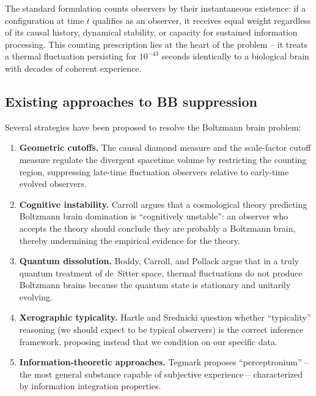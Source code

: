 \documentclass[11pt]{article}
\begin{document}
The standard formulation counts observers by their instantaneous
existence: if a configuration at time $t$ qualifies as an observer,
it receives equal weight regardless of its causal history, dynamical
stability, or capacity for sustained information processing.  This
counting prescription lies at the heart of the problem -- it treats a
thermal fluctuation persisting for $10^{-43}$ seconds identically to
a biological brain with decades of coherent experience.

\subsection{Existing approaches to BB suppression}

Several strategies have been proposed to resolve the Boltzmann brain
problem:

\begin{enumerate}
\item \textbf{Geometric cutoffs.}  The causal diamond measure
  \cite{Bousso2006} and the scale-factor cutoff measure
  \cite{DeSimone2010} regulate the divergent spacetime volume by
  restricting the counting region, suppressing late-time fluctuation
  observers relative to early-time evolved observers.

\item \textbf{Cognitive instability.}  Carroll \cite{Carroll2017}
  argues that a cosmological theory predicting Boltzmann brain
  domination is ``cognitively unstable'': an observer who accepts the
  theory should conclude they are probably a Boltzmann brain, thereby
  undermining the empirical evidence for the theory.

\item \textbf{Quantum dissolution.}  Boddy, Carroll, and Pollack
  \cite{BoddyCarrollPollack2014} argue that in a truly quantum
  treatment of de~Sitter space, thermal fluctuations do not produce
  Boltzmann brains because the quantum state is stationary and
  unitarily evolving.

\item \textbf{Xerographic typicality.}  Hartle and Srednicki
  \cite{HartleSrednicki2007} question whether ``typicality'' reasoning
  (we should expect to be typical observers) is the correct inference
  framework, proposing instead that we condition on our specific data.

\item \textbf{Information-theoretic approaches.}  Tegmark
  \cite{Tegmark2014} proposes ``perceptronium'' -- the most general
  substance capable of subjective experience -- characterized by
  information integration properties.
\end{enumerate}
\end{document}
